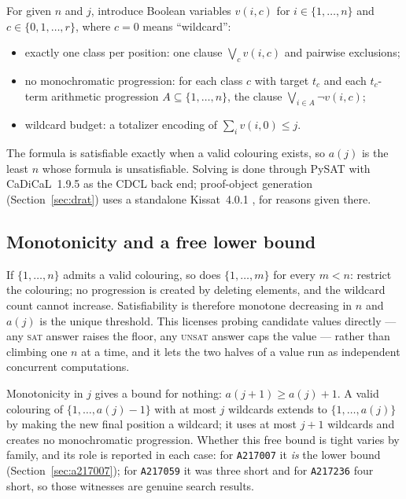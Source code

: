 \documentclass[12pt]{article}
\theoremstyle{remark}
\newcommand{\seq}[1]{\texttt{#1}}
\begin{document}
For given $n$ and $j$, introduce Boolean variables $v(i,c)$ for
$i \in \{1,\dots,n\}$ and $c \in \{0,1,\dots,r\}$, where $c=0$ means
``wildcard'':
\begin{itemize}
\item exactly one class per position: one clause $\bigvee_c v(i,c)$ and
  pairwise exclusions;
\item no monochromatic progression: for each class $c$ with target $t_c$ and
  each $t_c$-term arithmetic progression $A \subseteq \{1,\dots,n\}$, the
  clause $\bigvee_{i \in A} \neg v(i,c)$;
\item wildcard budget: a totalizer encoding \cite{totalizer} of
  $\sum_i v(i,0) \le j$.
\end{itemize}
The formula is satisfiable exactly when a valid colouring exists, so $a(j)$
is the least $n$ whose formula is unsatisfiable. Solving is done through
PySAT \cite{pysat} with CaDiCaL~1.9.5 \cite{cadical} as the CDCL back end;
proof-object generation (Section~\ref{sec:drat}) uses a standalone
Kissat~4.0.1 \cite{cadical}, for reasons given there.

\subsection{Monotonicity and a free lower bound}\label{sec:mono}

If $\{1,\dots,n\}$ admits a valid colouring, so does $\{1,\dots,m\}$ for
every $m<n$: restrict the colouring; no progression is created by deleting
elements, and the wildcard count cannot increase. Satisfiability is therefore
monotone decreasing in $n$ and $a(j)$ is the unique threshold. This licenses
probing candidate values directly --- any \textsc{sat} answer raises the
floor, any \textsc{unsat} answer caps the value --- rather than climbing one
$n$ at a time, and it lets the two halves of a value run as independent
concurrent computations.

Monotonicity in $j$ gives a bound for nothing: $a(j+1) \ge a(j)+1$. A valid
colouring of $\{1,\dots,a(j)-1\}$ with at most $j$ wildcards extends to
$\{1,\dots,a(j)\}$ by making the new final position a wildcard; it uses at
most $j+1$ wildcards and creates no monochromatic progression. Whether this
free bound is tight varies by family, and its role is reported in
each case: for \seq{A217007} it \emph{is} the lower bound
(Section~\ref{sec:a217007}); for \seq{A217059} it was three short and for
\seq{A217236} four short, so those witnesses are genuine search results.
\end{document}
